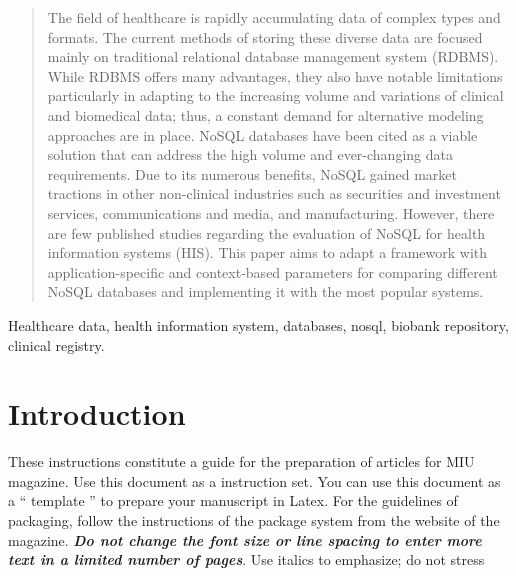 \documentclass[5p,times,authoryear]{elsarticle}
\begin{document}
\begin{frontmatter}
\begin{abstract}
The field of healthcare is rapidly accumulating data of complex types and formats. The current methods of storing these diverse data are focused mainly on traditional relational database management system (RDBMS). While RDBMS offers many advantages, they also have notable limitations particularly in adapting to the increasing volume and variations of clinical and biomedical data; thus, a constant demand for alternative modeling approaches are in place. NoSQL databases have been cited as a viable solution that can address the high volume and ever-changing data requirements. Due to its numerous benefits, NoSQL gained market tractions in other non-clinical industries such as securities and investment services, communications and media, and manufacturing. However, there are few published studies regarding the evaluation of NoSQL for health information systems (HIS). This paper aims to adapt a framework with application-specific and context-based parameters for comparing different NoSQL databases and implementing it with the most popular systems. 
\end{abstract}

\begin{keyword}

Healthcare data, health information system, databases, nosql, biobank repository, clinical registry.

\end{keyword}

\end{frontmatter}


\section{Introduction}

These instructions constitute a guide for the preparation of
articles for MIU magazine. Use this document as a
instruction set. You can use this document as
a `` template '' to prepare your manuscript in Latex. For the guidelines
of packaging, follow the instructions of the package system
from the website of the magazine.
{\bf{\emph {Do not change the font size or line spacing to enter more text in a limited number of pages}}}. Use italics to emphasize; do not stress
\end{document}
